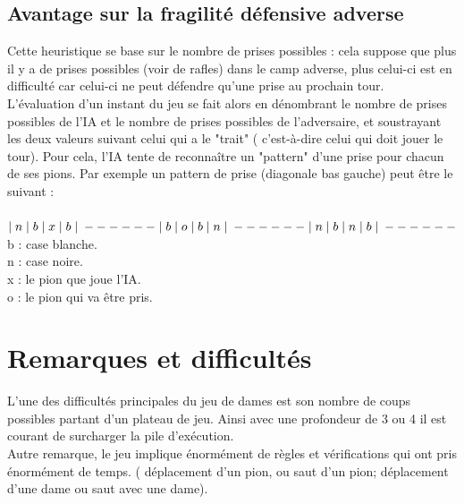 \documentclass[10pt,a4paper]{report}
\begin{document}
	\subsection{Avantage sur la fragilité défensive adverse }
	Cette heuristique se base sur le nombre de prises possibles : cela suppose que plus il y a de prises possibles (voir de rafles) dans le camp adverse, plus celui-ci est en difficulté car celui-ci ne peut défendre qu'une prise au prochain tour.\\
	L'évaluation d'un instant du jeu se fait alors en dénombrant le nombre de prises possibles de l'IA et le nombre de prises possibles de l'adversaire, et soustrayant les deux valeurs suivant celui qui a le "trait" ( c'est-à-dire celui qui doit jouer le tour).
	Pour cela, l'IA tente de reconnaître un "pattern" d'une prise pour chacun de ses pions. Par exemple un pattern de prise (diagonale bas gauche) peut être le suivant :\\
	\\
	$\mid n \mid b \mid x \mid b \mid\\
	------\\
	\mid b \mid o \mid b \mid n \mid\\
	------\\
	\mid n \mid b \mid n \mid b \mid\\
	------\\ $
	\\
	b : case blanche.\\
	n : case noire.\\
	x : le pion que joue l'IA.\\
	o : le pion qui va être pris.\\
\section{Remarques et difficultés}

L'une des difficultés principales du jeu de dames est son nombre de coups possibles partant d'un plateau de jeu. Ainsi avec une profondeur de 3 ou 4 il est courant de surcharger la pile d'exécution. \\

Autre remarque, le jeu implique énormément de règles et vérifications qui ont pris énormément de temps.
( déplacement d'un pion, ou saut d'un pion; déplacement d'une dame ou saut avec une dame). \\
\end{document}

